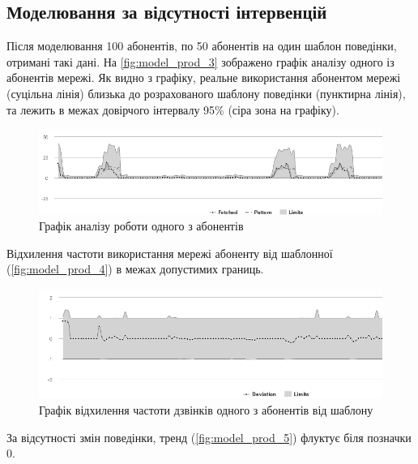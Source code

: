 \subsection{Моделювання за відсутності інтервенцій}

Після моделювання 100 абонентів, по 50 абонентів на один шаблон поведінки, отримані такі дані. На \autoref{fig:model_prod_3} зображено графік аналізу одного із абонентів мережі. Як видно з графіку, реальне використання абонентом мережі (суцільна лінія) близька до розрахованого шаблону поведінки (пунктирна лінія), та лежить в межах довірчого інтервалу 95\% (сіра зона на графіку).

\begin{figure}[h!]
        \begin{center}
            \includegraphics[scale=0.55]{resources/model_2_3.png}
        \end{center}
        \caption{Графік аналізу роботи одного з абонентів}
        \label{fig:model_prod_3}
\end{figure}

Відхилення частоти використання мережі абоненту від шаблонної (\autoref{fig:model_prod_4}) в межах допустимих границь.

\begin{figure}[h!]
        \begin{center}
            \includegraphics[scale=0.55]{resources/model_2_4.png}
        \end{center}
        \caption{Графік відхилення частоти дзвінків одного з абонентів від шаблону}
        \label{fig:model_prod_4}
\end{figure}

За відсутності змін поведінки, тренд (\autoref{fig:model_prod_5}) флуктує біля позначки 0.


